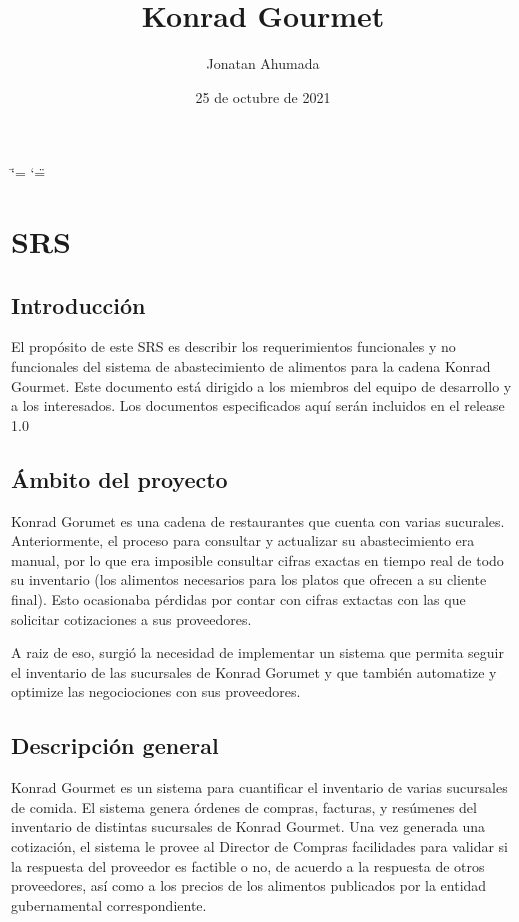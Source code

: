 \documentclass[letterpaper,10pt,spanish]{sphinxmanual}
\title{Konrad Gourmet}
\date{25 de octubre de 2021}
\author{Jonatan Ahumada}
\begin{document}
\ifdefined\shorthandoff
  \ifnum\catcode`\=\string=\active\shorthandoff{=}\fi
  \ifnum\catcode`\"=\active{}\fi
\fi

\pagestyle{empty}
\sphinxmaketitle
\pagestyle{plain}
\sphinxtableofcontents
\pagestyle{normal}
\label{\detokenize{index::doc}}



\chapter{SRS}
\label{\detokenize{SRS:srs}}\label{\detokenize{SRS::doc}}

\section{Introducción}
\label{\detokenize{SRS:introduccion}}
\sphinxAtStartPar
El propósito de este SRS es
describir los requerimientos
funcionales y no funcionales
del sistema de abastecimiento
de alimentos para la cadena
Konrad Gourmet. Este documento
está dirigido a los miembros
del equipo de desarrollo
y a los interesados. Los
documentos especificados
aquí serán incluidos en el release
1.0


\section{Ámbito del proyecto}
\label{\detokenize{SRS:ambito-del-proyecto}}
\sphinxAtStartPar
Konrad Gorumet es una cadena de
restaurantes que cuenta con varias sucurales.
Anteriormente, el proceso para consultar y
actualizar su abastecimiento era manual,
por lo que era imposible consultar
cifras exactas en tiempo real de todo
su inventario (los alimentos necesarios para
los platos que ofrecen a su cliente final). Esto ocasionaba pérdidas
por contar con cifras extactas con las
que solicitar cotizaciones a sus proveedores.

\sphinxAtStartPar
A raiz de eso, surgió la necesidad de implementar
un sistema que permita seguir el inventario
de las sucursales de Konrad Gorumet y que también automatize
y optimize las negociociones con sus proveedores.


\section{Descripción general}
\label{\detokenize{SRS:descripcion-general}}
\sphinxAtStartPar
Konrad Gourmet es un sistema para
cuantificar el inventario de
varias sucursales de comida.
El sistema genera órdenes de compras,
facturas, y resúmenes del inventario
de distintas sucursales de Konrad
Gourmet. Una vez generada una cotización,
el sistema le provee al Director de Compras
facilidades para validar si la respuesta del
proveedor es factible o no, de acuerdo
a la respuesta de otros proveedores, así
como a los precios de los alimentos
publicados por la entidad gubernamental
correspondiente.
\end{document}
